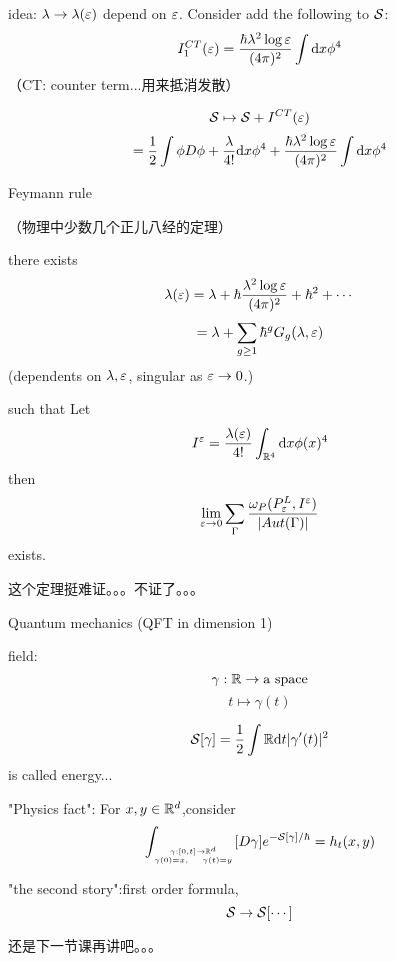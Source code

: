 idea: $\lambda\to\lambda(\varepsilon)$ depend on $\varepsilon$.
Consider add the following to $\mathcal{S}$:
$$I^{CT}_1(\varepsilon)=\frac{\hbar\lambda^2\log\varepsilon}{(4\pi)^2}\int\mathrm{d} x\phi^4$$
（CT: counter term...用来抵消发散）

$$\mathcal{S}\mapsto\mathcal{S}+I^{CT}(\varepsilon)$$
$$=\frac{1}{2}\int\phi D\phi+\frac{\lambda}{4!}\mathrm{d} x\phi^4+
\frac{\hbar\lambda^2\log\varepsilon}{(4\pi)^2}\int\mathrm{d} x\phi^4$$

Feymann rule

\begin{thm}[Physics]（物理中少数几个正儿八经的定理）

there exists
$$\lambda(\varepsilon)=\lambda+\hbar\frac{\lambda^2\log\varepsilon}{(4\pi)^2}+\hbar^2+\cdots$$
$$=\lambda+\sum_{g\geq 1}\hbar^gG_g(\lambda,\varepsilon)$$
(dependents on $\lambda,\varepsilon$, singular as $\varepsilon\to 0$.)

such that Let
$$I^{\varepsilon}=\frac{\lambda(\varepsilon)}{4!}\int_{\mathbb{R}^4}\mathrm{d} x\phi(x)^4$$
then
$$
  \lim_{\varepsilon\to 0}\sum_{\Gamma}
  \frac{\omega_P(P_\varepsilon^L,I^\varepsilon)}
       {|Aut(\Gamma)|}
$$
exists.
\end{thm}

这个定理挺难证。。。不证了。。。

\begin{example}Quantum mechanics (QFT in dimension 1)

field:
$$\gamma:\mathbb{R}\to\text{a space}$$
$$t\mapsto \gamma(t)$$

$$\mathcal{S}[\gamma]=\frac{1}{2}\int\mathbb{R}\mathrm{d} t|\gamma'(t)|^2$$
is called energy...

\end{example}

"Physics fact": For $x,y\in\mathbb{R}^d$,consider
$$\int_{\gamma:[0,t]\to\mathbb{R}^d\atop\gamma(0)=x,\quad\gamma(t)=y}
[D\gamma]e^{-\mathcal{S}[\gamma]/\hbar}
=h_t(x,y)$$

"the second story":first order formula,
$$\mathcal{S}\to\mathcal{S}[\cdots]$$

还是下一节课再讲吧。。。





